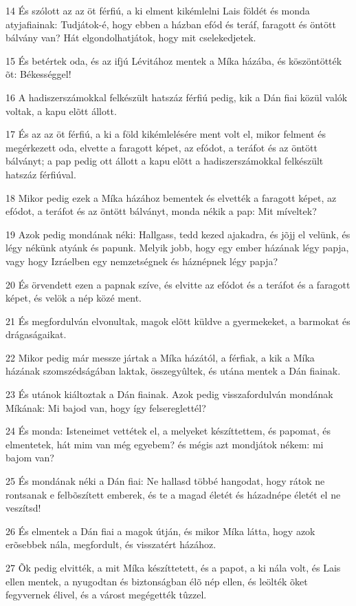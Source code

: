 \par 14 És szólott az az öt férfiú, a ki elment kikémlelni Lais földét és monda atyjafiainak: Tudjátok-é, hogy ebben a házban efód és teráf, faragott és öntött bálvány van? Hát elgondolhatjátok, hogy mit cselekedjetek.
\par 15 És betértek oda, és az ifjú Lévitához mentek a Míka házába, és köszöntötték õt: Békességgel!
\par 16 A hadiszerszámokkal felkészült hatszáz férfiú pedig, kik a Dán fiai közül valók voltak, a kapu elõtt állott.
\par 17 És az az öt férfiú, a ki a föld kikémlelésére ment volt el, mikor felment és megérkezett oda, elvette a faragott képet, az efódot, a teráfot és az öntött bálványt; a pap pedig ott állott a kapu elõtt a hadiszerszámokkal felkészült hatszáz férfiúval.
\par 18 Mikor pedig ezek a Míka házához bementek és elvették a faragott képet, az efódot, a teráfot és az öntött bálványt, monda nékik a pap: Mit míveltek?
\par 19 Azok pedig mondának néki: Hallgass, tedd kezed ajakadra, és jõjj el velünk, és légy nékünk atyánk és papunk. Melyik jobb, hogy egy ember házának légy papja, vagy hogy Izráelben egy nemzetségnek és háznépnek légy papja?
\par 20 És örvendett ezen a papnak szíve, és elvitte az efódot és a teráfot és a faragott képet, és velök a nép közé ment.
\par 21 És megfordulván elvonultak, magok elõtt küldve a gyermekeket, a barmokat és drágaságaikat.
\par 22 Mikor pedig már messze jártak a Míka házától, a férfiak, a kik a Míka házának szomszédságában laktak, összegyûltek, és utána mentek a Dán fiainak.
\par 23 És utánok kiáltoztak a Dán fiainak. Azok pedig visszafordulván mondának Míkának: Mi bajod van, hogy így felsereglettél?
\par 24 És monda: Isteneimet vettétek el, a melyeket készíttettem, és papomat, és elmentetek, hát mim van még egyebem? és mégis azt mondjátok nékem: mi bajom van?
\par 25 És mondának néki a Dán fiai: Ne hallasd többé hangodat, hogy rátok ne rontsanak e felbõszített emberek, és te a magad életét és házadnépe életét el ne veszítsd!
\par 26 És elmentek a Dán fiai a magok útján, és mikor Míka látta, hogy azok erõsebbek nála, megfordult, és visszatért házához.
\par 27 Õk pedig elvitték, a mit Míka készíttetett, és a papot, a ki nála volt, és Lais ellen mentek, a nyugodtan és biztonságban élõ nép ellen, és leölték õket fegyvernek élivel, és a várost megégették tûzzel.
